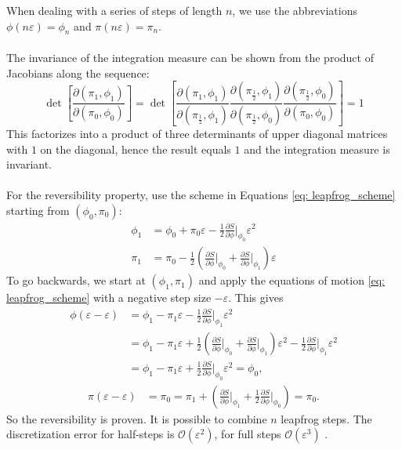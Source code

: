 When dealing with a series of steps of length $n$, we use the abbreviations $\phi(n \varepsilon) = \phi_n$ and $\pi(n \varepsilon) = \pi_n$. 
\\\\
The invariance of the integration measure can be shown from the product of Jacobians along the sequence: 
\begin{equation}
    \det \left[ \frac{\partial(\pi_1, \phi_1)}{\partial(\pi_0, \phi_0)}\right] = \det \left[ \frac{\partial(\pi_1, \phi_1)}{\partial(\pi_\frac{1}{2}, \phi_1)} \frac{\partial(\pi_\frac{1}{2}, \phi_1)}{\partial(\pi_\frac12, \phi_0)} \frac{\partial(\pi_\frac12, \phi_0)}{\partial(\pi_0, \phi_0)}\right] = 1
\end{equation}
This factorizes into a product of three determinants of upper diagonal matrices with $1$ on the diagonal, hence the result equals $1$ and the integration measure is invariant. 
\\\\
For the reversibility property, use the scheme in Equations \ref{eq: leapfrog_scheme} starting from $(\phi_0, \pi_0)$: 
\begin{align}
    \phi_1 &= \phi_0 + \pi_0 \varepsilon - \frac{1}{2}\frac{\partial S}{\partial \phi} \vert_{\phi_0} \varepsilon^2 \\
    \pi_1 &= \pi_0 - \frac{1}{2} \left( \frac{\partial S}{\partial \phi}\vert_{\phi_0} + \frac{\partial S}{\partial \phi} \vert_{\phi_1}\right) \varepsilon
\end{align}
To go backwards, we start at $(\phi_1, \pi_1)$ and apply the equations of motion \ref{eq: leapfrog_scheme} with a negative step size $-\varepsilon$. This gives
\begin{align}
    \phi(\varepsilon - \varepsilon) &= \phi_1 - \pi_1 \varepsilon - \frac{1}{2}\frac{\partial S}{\partial \phi} \vert_{\phi_1} \varepsilon^2 \\ 
    &= \phi_1 - \pi_1 \varepsilon + \frac{1}{2}\left( \frac{\partial S}{\partial \phi}\vert_{\phi_0} + \frac{\partial S}{\partial \phi} \vert_{\phi_1} \right)\varepsilon^2 - \frac{1}{2}\frac{\partial S}{\partial \phi}\vert_{\phi_1} \varepsilon^2 \\
    &= \phi_1 - \pi_1 \varepsilon + \frac{1}{2} \frac{\partial S}{\partial \phi}\vert_{\phi_0} \varepsilon^2 = \phi_0, 
\end{align}
\begin{align}
    \pi(\varepsilon - \varepsilon) &= \pi_0 = \pi_1 + \left( \frac{\partial S}{\partial \phi} \vert_{\phi_1} + \frac{1}{2}\frac{\partial S}{\partial \phi}\vert_{\phi_0}\right) = \pi_0. 
\end{align}
So the reversibility is proven. It is possible to combine $n$ leapfrog steps. The discretization error for half-steps is $\mathcal{O}(\varepsilon^2)$, for full steps $\mathcal{O}(\varepsilon^3)$ \cite{GattingerLang}. 
